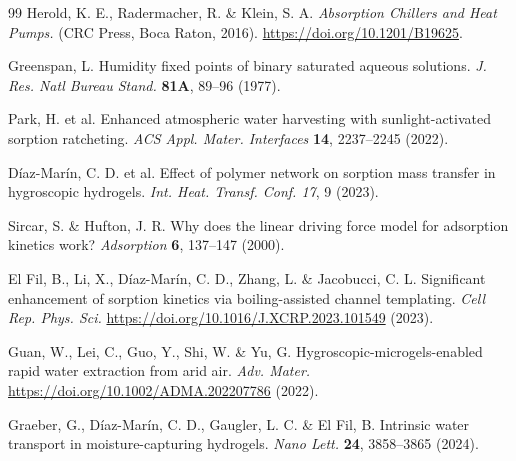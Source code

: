 \documentclass[11pt]{article}
\begin{document}
\begin{thebibliography}{99}
 Herold, K. E., Radermacher, R. \& Klein, S. A. \textit{Absorption Chillers and Heat Pumps.} (CRC Press, Boca Raton, 2016). \url{https://doi.org/10.1201/B19625}.

 Greenspan, L. Humidity fixed points of binary saturated aqueous solutions. \textit{J. Res. Natl Bureau Stand.} \textbf{81A}, 89--96 (1977).

 Park, H. et al. Enhanced atmospheric water harvesting with sunlight-activated sorption ratcheting. \textit{ACS Appl. Mater. Interfaces} \textbf{14}, 2237--2245 (2022).

 D\'iaz-Mar\'in, C. D. et al. Effect of polymer network on sorption mass transfer in hygroscopic hydrogels. \textit{Int. Heat. Transf. Conf. 17}, 9 (2023).

 Sircar, S. \& Hufton, J. R. Why does the linear driving force model for adsorption kinetics work? \textit{Adsorption} \textbf{6}, 137--147 (2000).

 El Fil, B., Li, X., D\'iaz-Mar\'in, C. D., Zhang, L. \& Jacobucci, C. L. Significant enhancement of sorption kinetics via boiling-assisted channel templating. \textit{Cell Rep. Phys. Sci.} \url{https://doi.org/10.1016/J.XCRP.2023.101549} (2023).

 Guan, W., Lei, C., Guo, Y., Shi, W. \& Yu, G. Hygroscopic-microgels-enabled rapid water extraction from arid air. \textit{Adv. Mater.} \url{https://doi.org/10.1002/ADMA.202207786} (2022).

 Graeber, G., D\'iaz-Mar\'in, C. D., Gaugler, L. C. \& El Fil, B. Intrinsic water transport in moisture-capturing hydrogels. \textit{Nano Lett.} \textbf{24}, 3858--3865 (2024).

\end{thebibliography}
\end{document}
